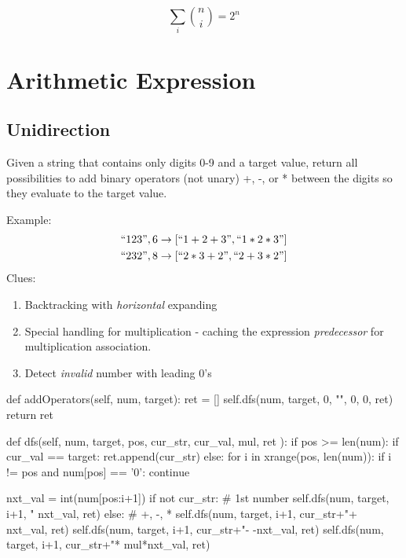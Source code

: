 $$\sum_i {n \choose i} = 2^n$$

\section{Arithmetic Expression}
\subsection{Unidirection}
 Given a string that contains only digits 0-9 and a target value,
return all possibilities to add binary operators (not unary) +, -, or * between the
digits so they evaluate to the target value.

Example: 
\begin{align*}
``123", 6 \rightarrow [``1+2+3", ``1*2*3"] \\ 
``232", 8 \rightarrow [``2*3+2", ``2+3*2"] \\
\end{align*}
Clues:
\begin{enumerate}
\item Backtracking with \textit{horizontal} expanding
\item Special handling for multiplication - caching the expression \textit{predecessor}
for multiplication association. 
\item Detect \textit{invalid} number with leading 0's
\end{enumerate}

\begin{python}
def addOperators(self, num, target):
  ret = []
  self.dfs(num, target, 0, "", 0, 0, ret)
  return ret

def dfs(self, num, target, pos, 
        cur_str, cur_val, 
        mul, ret
):
  if pos >= len(num):
    if cur_val == target:
      ret.append(cur_str)
  else:
    for i in xrange(pos, len(num)):
      if i != pos and num[pos] == '0':
        continue
        
      nxt_val = int(num[pos:i+1])
      if not cur_str:  # 1st number
        self.dfs(num, target, i+1, 
            "%
            nxt_val, ret)
      else:  # +, -, *
        self.dfs(num, target, i+1, 
            cur_str+"+%
            nxt_val, ret)
        self.dfs(num, target, i+1, 
            cur_str+"-%
            -nxt_val, ret)
        self.dfs(num, target, i+1, 
    cur_str+"*%
            mul*nxt_val, ret)
\end{python}
